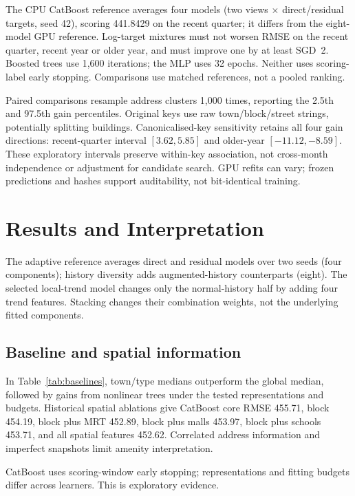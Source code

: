 \documentclass[conference]{IEEEtran}
\begin{document}
The CPU CatBoost reference averages four models (two views $\times$ direct/residual targets, seed 42), scoring 441.8429 on the recent quarter; it differs from the eight-model GPU reference. Log-target mixtures must not worsen RMSE on the recent quarter, recent year or older year, and must improve one by at least SGD~2. Boosted trees use 1,600 iterations; the MLP uses 32 epochs. Neither uses scoring-label early stopping. Comparisons use matched references, not a pooled ranking.

Paired comparisons resample address clusters 1,000 times, reporting the 2.5th and 97.5th gain percentiles. Original keys use raw town/block/street strings, potentially splitting buildings. Canonicalised-key sensitivity retains all four gain directions: recent-quarter interval $[3.62,5.85]$ and older-year $[-11.12,-8.59]$. These exploratory intervals preserve within-key association, not cross-month independence or adjustment for candidate search. GPU refits can vary; frozen predictions and hashes support auditability, not bit-identical training.

\section{Results and Interpretation}\label{sec:results}

The adaptive reference averages direct and residual models over two seeds (four components); history diversity adds augmented-history counterparts (eight). The selected local-trend model changes only the normal-history half by adding four trend features. Stacking changes their combination weights, not the underlying fitted components.

\subsection{Baseline and spatial information}
In Table~\ref{tab:baselines}, town/type medians outperform the global median, followed by gains from nonlinear trees under the tested representations and budgets. Historical spatial ablations give CatBoost core RMSE 455.71, block 454.19, block plus MRT 452.89, block plus malls 453.97, block plus schools 453.71, and all spatial features 452.62. Correlated address information and imperfect snapshots limit amenity interpretation.

\begin{table}[!tb]
\caption{Exploratory core-input references, January--March 2025 (SGD).}
\label{tab:baselines}\centering\small
\par\smallskip\raggedright\footnotesize CatBoost uses scoring-window early stopping; representations and fitting budgets differ across learners. This is exploratory evidence.
\end{table}
\end{document}
